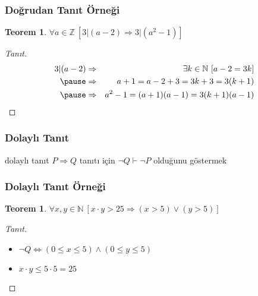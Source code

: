 \documentclass[dvipsnames]{beamer}
\theoremstyle{definition}
\theoremstyle{example}
\theoremstyle{plain}
\newtheorem{teorem}[theorem]{Teorem}
\begin{document}
\begin{frame}
  \frametitle{Doğrudan Tanıt Örneği}

  \begin{teorem}
    $\forall a \in \mathbb{Z}~[3 | (a-2) \Rightarrow 3 | (a^2-1)]$
  \end{teorem}

  \pause
  \begin{proof}[Tanıt]
    \begin{eqnarray*}
      3 | (a-2) & \Rightarrow & \exists k \in \mathbb{N}~[a-2 = 3k]\\\pause
                & \Rightarrow & a+1 = a-2 + 3 = 3k+3 = 3(k+1)\\\pause
                & \Rightarrow & a^2-1 = (a+1)(a-1) = 3(k+1)(a-1)
    \end{eqnarray*}
  \end{proof}
\end{frame}

\begin{frame}
  \frametitle{Dolaylı Tanıt}

  \begin{block}{dolaylı tanıt}
    $P \Rightarrow Q$ tanıtı için $\neg Q \vdash \neg P$ olduğunu göstermek
  \end{block}
\end{frame}

\begin{frame}
  \frametitle{Dolaylı Tanıt Örneği}

  \begin{teorem}
    $\forall x,y \in \mathbb{N}~[x \cdot y > 25
      \Rightarrow (x > 5) \vee (y > 5)]$
  \end{teorem}

  \pause
  \begin{proof}[Tanıt]
    \begin{itemize}
      \item $\neg Q \Leftrightarrow (0 \leq x \leq 5) \wedge (0 \leq y \leq 5)$

      \pause
      \item $x \cdot y \leq 5 \cdot 5 = 25$
    \end{itemize}
  \end{proof}
\end{frame}
\end{document}
